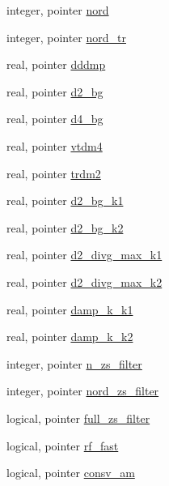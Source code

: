\begin{DoxyCompactItemize}
\item 
integer, pointer \hyperlink{classfv__control__mod_ab04c00bf38a9bb2111f7787ad1d92be0}{nord}
\item 
integer, pointer \hyperlink{classfv__control__mod_a68ec2562c9db66671c7d7b4cbd3d88b8}{nord\-\_\-tr}
\item 
real, pointer \hyperlink{classfv__control__mod_a24119b4a68eeaddf30c32d7c9f3cad41}{dddmp}
\item 
real, pointer \hyperlink{classfv__control__mod_adf2af616e47d9f38418179eaf0eb84aa}{d2\-\_\-bg}
\item 
real, pointer \hyperlink{classfv__control__mod_a0e1b0fd6d4c21d485510378c79c59914}{d4\-\_\-bg}
\item 
real, pointer \hyperlink{classfv__control__mod_a5ea33e8ef19009f42a071cbd5c861413}{vtdm4}
\item 
real, pointer \hyperlink{classfv__control__mod_a1c559ada35adc60b532cc77e0a7963ec}{trdm2}
\item 
real, pointer \hyperlink{classfv__control__mod_ae8d918b4d99a7e2fc1d25041ab7d99a1}{d2\-\_\-bg\-\_\-k1}
\item 
real, pointer \hyperlink{classfv__control__mod_a216ec767e61e174cefa24dc5762f234c}{d2\-\_\-bg\-\_\-k2}
\item 
real, pointer \hyperlink{classfv__control__mod_a2dc7ef9c15b934d9f19130db25179437}{d2\-\_\-divg\-\_\-max\-\_\-k1}
\item 
real, pointer \hyperlink{classfv__control__mod_a4fd4a8dd3bd72aafb8fcbaf4c29e78b1}{d2\-\_\-divg\-\_\-max\-\_\-k2}
\item 
real, pointer \hyperlink{classfv__control__mod_a58caca738b75ce861c8b4d95021207d7}{damp\-\_\-k\-\_\-k1}
\item 
real, pointer \hyperlink{classfv__control__mod_a322872be8489e07ab3bda83ccdf28c6d}{damp\-\_\-k\-\_\-k2}
\item 
integer, pointer \hyperlink{classfv__control__mod_a35724aa7d912fc934a1706bee488134b}{n\-\_\-zs\-\_\-filter}
\item 
integer, pointer \hyperlink{classfv__control__mod_a9b3efe0ee1171abdffb92d589012c488}{nord\-\_\-zs\-\_\-filter}
\item 
logical, pointer \hyperlink{classfv__control__mod_a1dfb700af3f7669f0629f42a68ba042f}{full\-\_\-zs\-\_\-filter}
\item 
logical, pointer \hyperlink{classfv__control__mod_ac25e0b8133cbc74acdfffc12de4ef035}{rf\-\_\-fast}
\item 
logical, pointer \hyperlink{classfv__control__mod_abe66b78f16d9db198fb246382e76dd2f}{consv\-\_\-am}

\end{DoxyCompactItemize}
